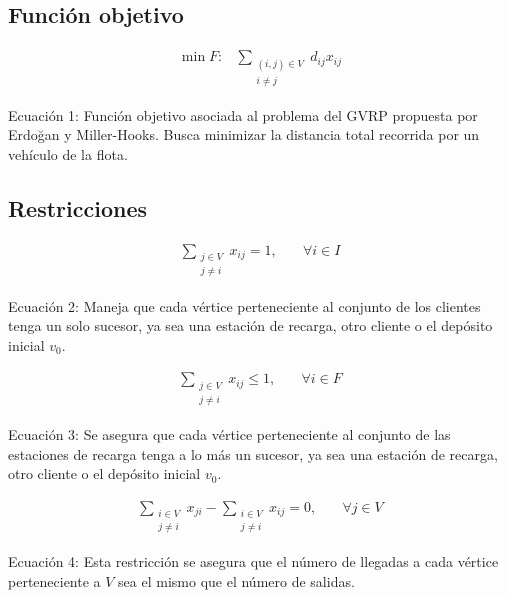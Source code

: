 \documentclass[letter, 10pt]{article}
\begin{document}
\subsection{Función objetivo}
\begin{align}
    \min F:
    & \sum_{\substack{(i,j)\in V\\ i \neq j}} d_{ij} x_{ij}
\end{align}
\begin{center}
    Ecuación 1: Función objetivo asociada al problema del GVRP propuesta por Erdoğan y Miller-Hooks. Busca minimizar la distancia total recorrida por un vehículo de la flota.
\end{center}

\subsection{Restricciones}
\begin{align}
    \sum_{\substack{j\in V\\ j \neq i}} x_{ij} = 1, & \quad \forall i \in I
\end{align}

\begin{center}
    Ecuación 2: Maneja que cada vértice perteneciente al conjunto de los clientes tenga un solo sucesor, ya sea una estación de recarga, otro cliente o el depósito inicial $v_0$.
\end{center}

\begin{align}
    \sum_{\substack{j\in V\\ j \neq i}} x_{ij} \leq 1, & \quad \forall i \in F
\end{align}

\begin{center}
    Ecuación 3: Se asegura que cada vértice perteneciente al conjunto de las estaciones de recarga tenga a lo más un sucesor, ya sea una estación de recarga, otro cliente o el depósito inicial $v_0$.
\end{center}

\begin{align}
    \sum_{\substack{i\in V\\ j \neq i}} x_{ji} - \sum_{\substack{i\in V\\ j \neq i}} x_{ij} = 0, & \quad \forall j \in V
\end{align}

\begin{center}
    Ecuación 4: Esta restricción se asegura que el número de llegadas a cada vértice perteneciente a $V$ sea el mismo que el número de salidas.
\end{center}
\end{document}
